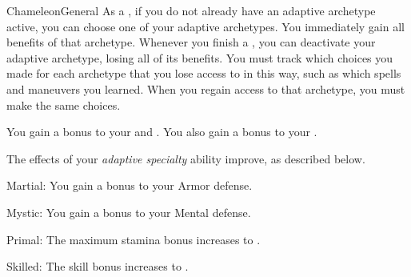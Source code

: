 \begin{feat}{Chameleon}{General}
    As a , if you do not already have an adaptive archetype active, you can choose one of your adaptive archetypes.
    You immediately gain all benefits of that archetype.
    Whenever you finish a , you can deactivate your adaptive archetype, losing all of its benefits.
    You must track which choices you made for each archetype that you lose access to in this way, such as which spells and maneuvers you learned.
    When you regain access to that archetype, you must make the same choices.

     You gain a  bonus to your  and .
    You also gain a  bonus to your .

     The effects of your \textit{adaptive specialty} ability improve, as described below.
    \begin{raggeditemize}
      \item Martial: You gain a  bonus to your Armor defense.
      \item Mystic: You gain a  bonus to your Mental defense.
      \item Primal: The maximum stamina bonus increases to .
      \item Skilled: The skill bonus increases to .
    \end{raggeditemize}
  \end{feat}

